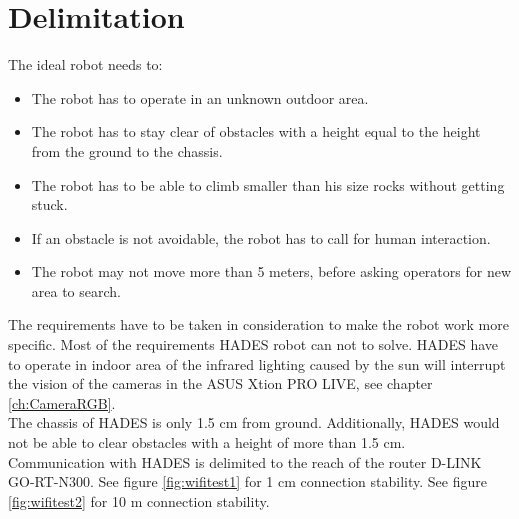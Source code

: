 \chapter{Delimitation} \label{ch:Delimitation}

The ideal robot needs to:

\begin{itemize}
    \item The robot has to operate in an unknown outdoor area.
    \item The robot has to stay clear of obstacles with a height equal to the height from the ground to the chassis. 
    \item The robot has to be able to climb smaller than his size rocks without getting stuck.
    \item If an obstacle is not avoidable, the robot has to call for human interaction.%
    \item The robot may not move more than 5 meters, before asking operators for new area to search.
\end{itemize}

The requirements have to be taken in consideration to make the robot work more specific. Most of the requirements HADES robot can not to solve. HADES have to operate in indoor area of the infrared lighting caused by the sun will interrupt the vision of the cameras in the ASUS Xtion PRO LIVE, see chapter \ref{ch:CameraRGB}.\\
The chassis of HADES is only 1.5 cm from ground. Additionally, HADES would not be able to clear obstacles with a height of more than 1.5 cm.\\
Communication with HADES is delimited to the reach of the router D-LINK GO-RT-N300.
See figure \ref{fig:wifitest1} for 1 cm connection stability.
See figure \ref{fig:wifitest2} for 10 m connection stability.




